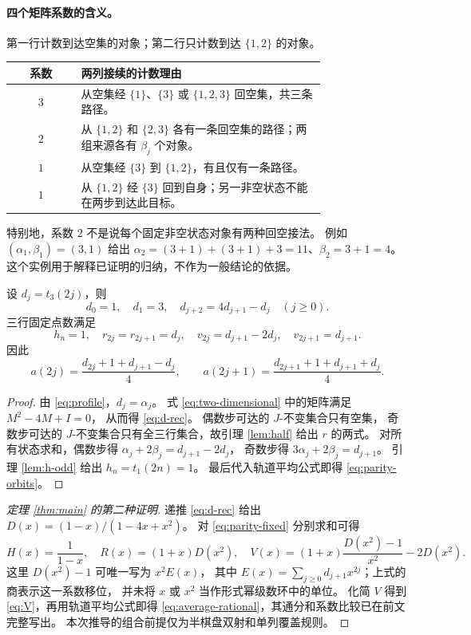 \paragraph{四个矩阵系数的含义。}
第一行计数到达空集的对象；第二行只计数到达 $\{1,2\}$ 的对象。
\begin{center}
\small
\begin{tabular}{cp{0.78\linewidth}}
\toprule
系数 & 两列接续的计数理由\\
\midrule
$3$ & 从空集经 $\{1\}$、$\{3\}$ 或 $\{1,2,3\}$ 回空集，共三条路径。\\
$2$ & 从 $\{1,2\}$ 和 $\{2,3\}$ 各有一条回空集的路径；两组来源各有 $\beta_j$ 个对象。\\
$1$ & 从空集经 $\{3\}$ 到 $\{1,2\}$，有且仅有一条路径。\\
$1$ & 从 $\{1,2\}$ 经 $\{3\}$ 回到自身；另一非空状态不能在两步到达此目标。\\
\bottomrule
\end{tabular}
\end{center}
特别地，系数 $2$ 不是说每个固定非空状态对象有两种回空接法。
例如 $(\alpha_1,\beta_1)=(3,1)$ 给出
$\alpha_2=(3+1)+(3+1)+3=11$、$\beta_2=3+1=4$。
这个实例用于解释已证明的归纳，不作为一般结论的依据。

\begin{proposition}\label{prop:parity}
设 $d_j=t_3(2j)$，则
\begin{equation}\label{eq:d-rec}
 d_0=1,\quad d_1=3,\quad d_{j+2}=4d_{j+1}-d_j\quad(j\ge0).
\end{equation}
三行固定点数满足
\begin{equation}\label{eq:parity-fixed}
 h_n=1,\quad r_{2j}=r_{2j+1}=d_j,\quad
 v_{2j}=d_{j+1}-2d_j,\quad v_{2j+1}=d_{j+1}.
\end{equation}
因此
\begin{equation}\label{eq:parity-orbits}
 a(2j)=\frac{d_{2j}+1+d_{j+1}-d_j}{4},\qquad
 a(2j+1)=\frac{d_{2j+1}+1+d_{j+1}+d_j}{4}.
\end{equation}
\end{proposition}
\begin{proof}
由 \eqref{eq:profile}，$d_j=\alpha_j$。
式 \eqref{eq:two-dimensional} 中的矩阵满足 $M^2-4M+I=0$，
从而得 \eqref{eq:d-rec}。
偶数步可达的 $J$-不变集合只有空集，
奇数步可达的 $J$-不变集合只有全三行集合，故引理 \ref{lem:half} 给出 $r$ 的两式。
对所有状态求和，偶数步得
$\alpha_j+2\beta_j=d_{j+1}-2d_j$，
奇数步得 $3\alpha_j+2\beta_j=d_{j+1}$。
引理 \ref{lem:h-odd} 给出 $h_n=t_1(2n)=1$。
最后代入轨道平均公式即得 \eqref{eq:parity-orbits}。
\end{proof}

\begin{proof}[定理 \ref{thm:main} 的第二种证明]
递推 \eqref{eq:d-rec} 给出 $D(x)=(1-x)/(1-4x+x^2)$。
对 \eqref{eq:parity-fixed} 分别求和可得
\[
 H(x)=\frac1{1-x},\quad R(x)=(1+x)D(x^2),\quad
 V(x)=(1+x)\frac{D(x^2)-1}{x^2}-2D(x^2).
\]
这里 $D(x^2)-1$ 可唯一写为 $x^2 E(x)$，
其中 $E(x)=\sum_{j\ge0}d_{j+1}x^{2j}$；上式的商表示这一系数移位，
并未将 $x$ 或 $x^2$ 当作形式幂级数环中的单位。
化简 $V$ 得到 \eqref{eq:V}，再用轨道平均公式即得
\eqref{eq:average-rational}，其通分和系数比较已在前文完整写出。
本次推导的组合前提仅为半棋盘双射和单列覆盖规则。
\end{proof}
